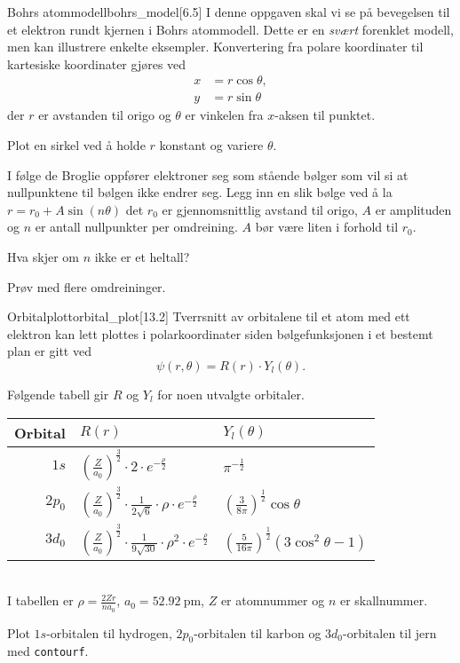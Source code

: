 \begin{exercise}{Bohrs atommodell}{bohrs_model}[6.5]
	I denne oppgaven skal vi se på bevegelsen til et elektron rundt kjernen i Bohrs atommodell. Dette er en \emph{svært} forenklet modell, men kan illustrere enkelte eksempler. Konvertering fra polare koordinater til kartesiske koordinater gjøres ved
	\begin{align*}
		x&=r\cos\theta,\\
		y&=r\sin\theta
	\end{align*}
	der $r$ er avstanden til origo og $\theta$ er vinkelen fra $x$-aksen til punktet.
	
	\subexercise Plot en sirkel ved å holde $r$ konstant og variere $\theta$.
	
	\subexercise I følge de Broglie oppfører elektroner seg som stående bølger som vil si at nullpunktene til bølgen ikke endrer seg. Legg inn en slik bølge ved å la $r=r_0+A\sin(n\theta)$ det $r_0$ er gjennomsnittlig avstand til origo, $A$ er amplituden og $n$ er antall nullpunkter per omdreining. $A$ bør være liten i forhold til $r_0$.
	
	\subexercise Hva skjer om $n$ ikke er et heltall?
	
	\hint Prøv med flere omdreininger.
\end{exercise}

\begin{exercise}{Orbitalplott}{orbital_plot}[13.2]
	Tverrsnitt av orbitalene til et atom med ett elektron kan lett plottes i polarkoordinater siden bølgefunksjonen i et bestemt plan er gitt ved
	\begin{equation*}
		\psi(r,\theta)=R(r)\cdot Y_l(\theta).
	\end{equation*}
	
	Følgende tabell gir $R$ og $Y_l$ for noen utvalgte orbitaler.\\
	
	{\renewcommand{\arraystretch}{1.2}
	\centering
	\begin{tabular}{rll}
		\toprule Orbital & $R(r)$ & $Y_l(\theta)$\\ 
		\midrule $1s$ & $\left( \frac{Z}{a_0}\right)^\frac{3}{2}\cdot2\cdot e^{-\frac{\rho}{2}} $ & $\pi^{-\frac12}$ \\
		$2p_0$ & $\left( \frac{Z}{a_0}\right)^\frac{3}{2}\cdot\frac{1}{2\sqrt 6}\cdot\rho\cdot e^{-\frac{\rho}{2}} $ & $\left( \frac{3}{8\pi}\right)^\frac{1}{2} \cos\theta$ \\
		$3d_0$ & $\left( \frac{Z}{a_0}\right)^\frac{3}{2}\cdot\frac{1}{9\sqrt{ 30}}\cdot\rho^2\cdot e^{-\frac{\rho}{2}} $ & $\left( \frac{5}{16\pi}\right)^\frac{1}{2} \left( 3\cos^2\theta-1\right) $ \\
		\bottomrule 
	\end{tabular}\par
	}\ \\
	
	I tabellen er $\rho=\frac{2Zr}{na_0}$, $a_0=\SI{52,92}{\pico\meter}$, $Z$ er atomnummer og $n$ er skallnummer.
	
	Plot $1s$-orbitalen til hydrogen, $2p_0$-orbitalen til karbon og $3d_0$-orbitalen til jern med \texttt{contourf}.
\end{exercise}

